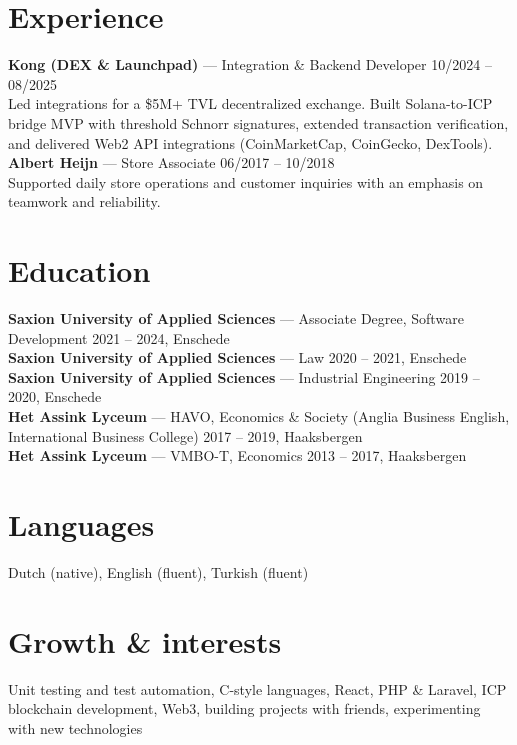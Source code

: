 \documentclass[10pt,a4paper]{article}
\begin{document}
\section*{Experience}
\textbf{Kong (DEX \& Launchpad)} --- Integration \& Backend Developer \hfill 10/2024 -- 08/2025\\[2pt]
Led integrations for a \$5M+ TVL decentralized exchange. Built Solana-to-ICP bridge MVP with threshold Schnorr signatures, extended transaction verification, and delivered Web2 API integrations (CoinMarketCap, CoinGecko, DexTools).\\[4pt]
\textbf{Albert Heijn} --- Store Associate \hfill 06/2017 -- 10/2018\\
Supported daily store operations and customer inquiries with an emphasis on teamwork and reliability.

\section*{Education}
\textbf{Saxion University of Applied Sciences} --- Associate Degree, Software Development \hfill 2021 -- 2024, Enschede \\
\textbf{Saxion University of Applied Sciences} --- Law \hfill 2020 -- 2021, Enschede \\
\textbf{Saxion University of Applied Sciences} --- Industrial Engineering \hfill 2019 -- 2020, Enschede \\
\textbf{Het Assink Lyceum} --- HAVO, Economics \& Society (Anglia Business English, International Business College) \hfill 2017 -- 2019, Haaksbergen \\
\textbf{Het Assink Lyceum} --- VMBO-T, Economics \hfill 2013 -- 2017, Haaksbergen

\section*{Languages}
Dutch (native), English (fluent), Turkish (fluent)

\section*{Growth \& interests}
Unit testing and test automation, C-style languages, React, PHP \& Laravel, ICP blockchain development, Web3, building projects with friends, experimenting with new technologies
\end{document}
